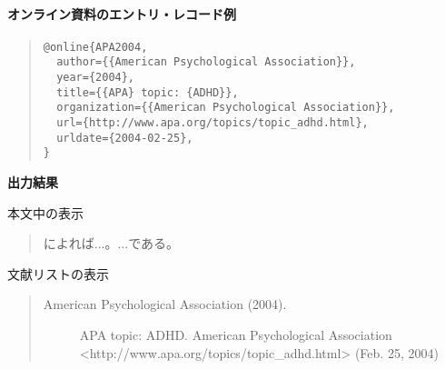 \documentclass[12pt]{ltjsarticle}
\begin{document}
\paragraph{オンライン資料のエントリ・レコード例}

\begin{quote}
\begin{verbatim}
@online{APA2004,
  author={{American Psychological Association}},
  year={2004},
  title={{APA} topic: {ADHD}},
  organization={{American Psychological Association}},
  url={http://www.apa.org/topics/topic_adhd.html},
  urldate={2004-02-25},
}
\end{verbatim}
\end{quote}

\textbf{出力結果}

本文中の表示
\begin{quote}
\textcite{APA2004}によれば...。...である\parencite{APA2004}。
\end{quote}

文献リストの表示
\begin{quote}
\begin{description}
  \item[\textrm{American Psychological Association (2004).}]APA topic: ADHD. American Psychological Association <http://www.apa.org/topics/topic\_adhd.html> (Feb. 25, 2004)
\end{description}
\end{quote}


\printbibliography[title=引用文献]
\end{document}
